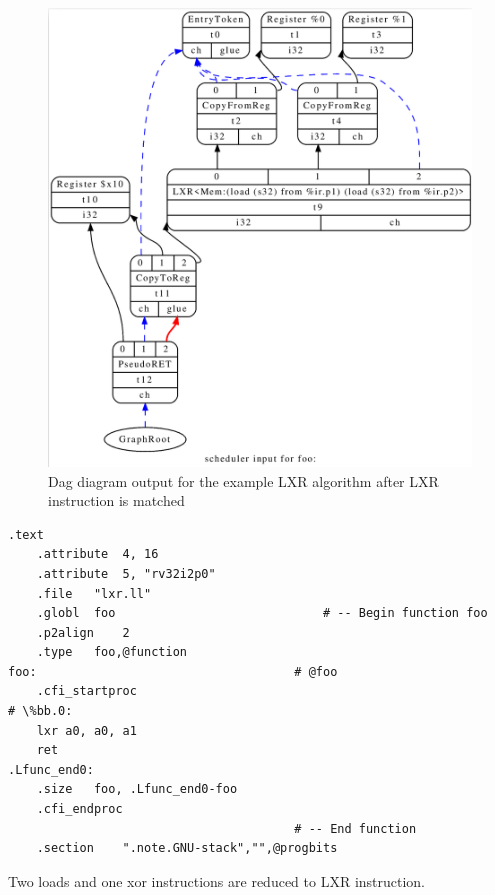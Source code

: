 \begin{figure}
    \centering
    \includegraphics[scale=0.3]{adding_new_instr/lxr_match.png}
    \caption{Dag diagram output for the example LXR algorithm after LXR instruction is matched}
    \label{fig:lxr_match}
\end{figure}


\begin{lstlisting}[caption= Assembly output with LXR instruction]
    .text
	.attribute	4, 16
	.attribute	5, "rv32i2p0"
	.file	"lxr.ll"
	.globl	foo                             # -- Begin function foo
	.p2align	2
	.type	foo,@function
foo:                                    # @foo
	.cfi_startproc
# \%bb.0:
	lxr	a0, a0, a1
	ret
.Lfunc_end0:
	.size	foo, .Lfunc_end0-foo
	.cfi_endproc
                                        # -- End function
	.section	".note.GNU-stack","",@progbits
\end{lstlisting}

Two loads and one xor instructions are reduced to LXR instruction.
\\\\
